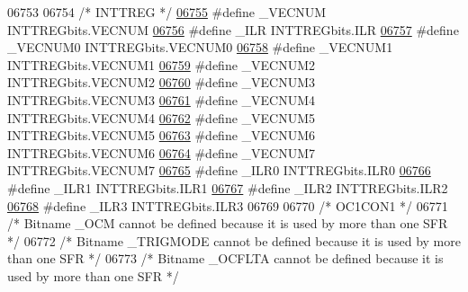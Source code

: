 \begin{DoxyCode}
06753 
06754 \textcolor{comment}{/* INTTREG */}
\hypertarget{a00009_source_l06755}{}\hyperlink{a00009_adecbf36d58511ae315fa7d2cad798796}{06755} \textcolor{preprocessor}{#define \_VECNUM INTTREGbits.VECNUM}
\hypertarget{a00009_source_l06756}{}\hyperlink{a00009_ac393caa490a0058e0213df0753d24d18}{06756} \textcolor{preprocessor}{#define \_ILR INTTREGbits.ILR}
\hypertarget{a00009_source_l06757}{}\hyperlink{a00009_a72778cf8f00d28ad0f3cca2933287f20}{06757} \textcolor{preprocessor}{#define \_VECNUM0 INTTREGbits.VECNUM0}
\hypertarget{a00009_source_l06758}{}\hyperlink{a00009_a2c8476d762a4278a8624ea39d7785599}{06758} \textcolor{preprocessor}{#define \_VECNUM1 INTTREGbits.VECNUM1}
\hypertarget{a00009_source_l06759}{}\hyperlink{a00009_af27b0b978b841602e934f95fe6c7bfc3}{06759} \textcolor{preprocessor}{#define \_VECNUM2 INTTREGbits.VECNUM2}
\hypertarget{a00009_source_l06760}{}\hyperlink{a00009_ae1ee44a63374e5f6ec90308e00c89055}{06760} \textcolor{preprocessor}{#define \_VECNUM3 INTTREGbits.VECNUM3}
\hypertarget{a00009_source_l06761}{}\hyperlink{a00009_aa4a367cda3c8b98ab2f3dbfd6d50a2fa}{06761} \textcolor{preprocessor}{#define \_VECNUM4 INTTREGbits.VECNUM4}
\hypertarget{a00009_source_l06762}{}\hyperlink{a00009_a18a20275f0edd32c159609971e7a82af}{06762} \textcolor{preprocessor}{#define \_VECNUM5 INTTREGbits.VECNUM5}
\hypertarget{a00009_source_l06763}{}\hyperlink{a00009_a7f1c44c248072ba41e1c0e350f8b54cc}{06763} \textcolor{preprocessor}{#define \_VECNUM6 INTTREGbits.VECNUM6}
\hypertarget{a00009_source_l06764}{}\hyperlink{a00009_a1b51c25a0cf6bc247672f686040aba9f}{06764} \textcolor{preprocessor}{#define \_VECNUM7 INTTREGbits.VECNUM7}
\hypertarget{a00009_source_l06765}{}\hyperlink{a00009_a7a75bd3a20a78283d48f95319af0695a}{06765} \textcolor{preprocessor}{#define \_ILR0 INTTREGbits.ILR0}
\hypertarget{a00009_source_l06766}{}\hyperlink{a00009_a70ffafff7741e9fa4a7906b65ddf67e2}{06766} \textcolor{preprocessor}{#define \_ILR1 INTTREGbits.ILR1}
\hypertarget{a00009_source_l06767}{}\hyperlink{a00009_ab4d0cf04564e68662cfb21aaaac76c93}{06767} \textcolor{preprocessor}{#define \_ILR2 INTTREGbits.ILR2}
\hypertarget{a00009_source_l06768}{}\hyperlink{a00009_a28c7a3c93e985b8137fab7b82fe5f726}{06768} \textcolor{preprocessor}{#define \_ILR3 INTTREGbits.ILR3}
06769 
06770 \textcolor{comment}{/* OC1CON1 */}
06771 \textcolor{comment}{/* Bitname \_OCM cannot be defined because it is used by more than one SFR */}
06772 \textcolor{comment}{/* Bitname \_TRIGMODE cannot be defined because it is used by more than one SFR */}
06773 \textcolor{comment}{/* Bitname \_OCFLTA cannot be defined because it is used by more than one SFR */}

\end{DoxyCode}
